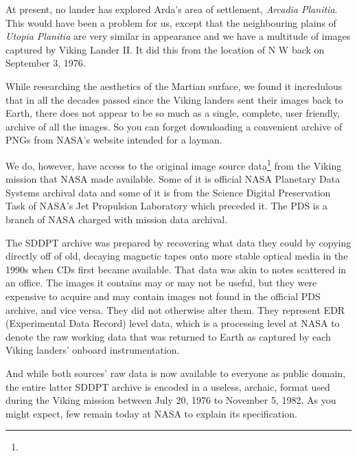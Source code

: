 At present, no lander has explored Arda's area of settlement, {\it Arcadia Planitia}. This would have been a problem for us, except that the neighbouring plains of {\it Utopia Planitia} are very similar in appearance and we have a multitude of images captured by Viking Lander II. It did this from the location of N W back on September 3, 1976.

    {}


While researching the aesthetics of the Martian surface, we found it incredulous that in all the decades passed since the Viking landers sent their images back to Earth, there does not appear to be so much as a single, complete, user friendly, archive of all the images. So you can forget downloading a convenient archive of PNGs from NASA's website intended for a layman.

We do, however, have access to the original image source data\footnote{} from the Viking mission that NASA made available. Some of it is official NASA Planetary Data Systems archival data and some of it is from the Science Digital Preservation Task of NASA's Jet Propulsion Laboratory which preceded it. The PDS is a branch of NASA charged with mission data archival.

The SDDPT archive was prepared by recovering what data they could by copying directly off of old, decaying magnetic tapes onto more stable optical media in the 1990s when CDs first became available. That data was  akin to notes scattered in an office. The images it contains may or may not be useful, but they were expensive to acquire and may contain images not found in the official PDS archive, and vice versa. They did not otherwise alter them. They represent EDR (Experimental Data Record) level data, which is a processing level at NASA to denote the raw working data that was returned to Earth as captured by each Viking landers' onboard instrumentation.

And while both sources' raw data is now available to everyone as public domain, the entire latter SDDPT archive is encoded in a useless, archaic, format used during the Viking mission between July 20, 1976 to November 5, 1982. As you might expect, few remain today at NASA to explain its specification.

